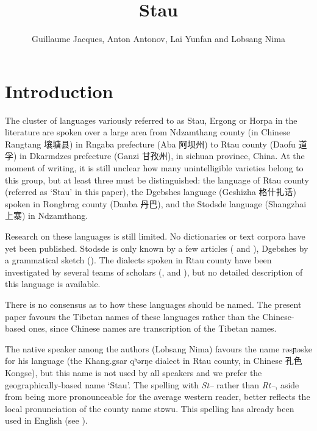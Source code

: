 \documentclass[oneside,a4paper,11pt]{article}
\newcommand{\ipa}[1]{{\phon #1}} %
\newcommand{\zh}[1]{{\cn #1}}
\begin{document}
 


\title{Stau}
\author{Guillaume Jacques, Anton Antonov, Lai Yunfan and Lobsang Nima}

\maketitle

 

\section{Introduction}
The cluster of languages variously referred to as Stau, Ergong or Horpa in the literature are spoken over a large area from Ndzamthang county (in Chinese Rangtang  \zh{壤塘县})  in Rngaba  prefecture (Aba \zh{阿坝州}) to Rtau county (Daofu \zh{道孚}) in Dkarmdzes prefecture (Ganzi \zh{甘孜州}), in sichuan province, China. At the moment of writing, it is still unclear how many unintelligible varieties belong to this group, but at least three must be distinguished: the language of Rtau county (referred as `Stau' in this paper), the Dgebshes language (Geshizha \zh{格什扎话})  spoken in Rongbrag county (Danba \zh{丹巴}), and the Stodsde language (Shangzhai \zh{上寨}) in Ndzamthang.  

Research on these languages is still limited. No dictionaries or text corpora have yet been published. Stodsde is only known by a few articles (\citealt{jackson00sidaba} and   \citealt{jackson07shangzhai}), Dgebshes by a grammatical sketch (\citealt{duoerji98geshizha}). The dialects spoken in Rtau county have been investigated by several teams of scholars (\citealt{huangbf91daofu}, \citealt{sun13gexi} and \citealt{jacques14rtau}), but no detailed description of this language is available.

There is no consensus as to how these languages should be named. The present paper favours the Tibetan names of these languages rather than the Chinese-based ones, since Chinese names are transcription of the Tibetan names. 

  The native speaker among the authors (Lobsang Nima) favours the name \ipa{rəsɲəske} for his language (the Khang.gsar \ipa{qʰərŋe} dialect in Rtau county, in Chinese \zh{孔色} Kongse), but this name is not used by all speakers and we prefer the geographically-based name  `Stau'. The spelling with \textit{St--} rather than \textit{Rt--}, aside from being more pronounceable for the average western reader, better reflects the local pronunciation of the county name \ipa{stʚwu}. This spelling has already been used in English (see \citealt{wang70stau}).   
  
\end{document}
